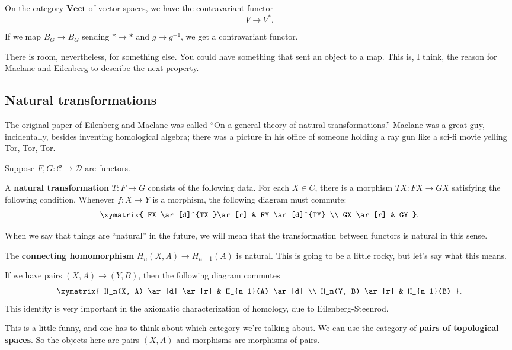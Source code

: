 \begin{example} On the category $\mathbf{Vect}$ of vector spaces, we have the
contravariant functor \[ V \to V^{\ast}. \] \end{example}

\begin{example} If we map $B_G \to B_G$ sending $\ast \to \ast$ and $g \to
g^{-1}$, we get a contravariant functor. \end{example}

There is room, nevertheless, for something else. You could have something that
sent an object to a map. This is, I think, the reason for Maclane and
Eilenberg to describe the next property.

\subsection{Natural transformations}

The original paper of Eilenberg and Maclane was called ``On a general theory
of natural transformations.'' Maclane was a great guy, incidentally, besides
inventing homological algebra; there was a picture in his office of someone
holding a ray gun like a sci-fi movie yelling Tor, Tor, Tor.

Suppose $F, G: \mathcal{C} \to \mathcal{D}$ are functors.

\begin{definition} A \textbf{natural transformation} $T: F \to G$ consists of
the following data. For each $X \in C$, there is a morphism $TX: FX \to GX$
satisfying the following condition. Whenever $f: X \to Y$ is a morphism, the
following diagram must commute: \[ \xymatrix{ FX \ar[d]^{TX }\ar[r] & FY
\ar[d]^{TY} \\ GX \ar[r] & GY }.\] \end{definition}

When we say that things are ``natural'' in the future, we will mean that the
transformation between functors is natural in this sense.

\begin{example} The \textbf{connecting homomorphism} $H_n(X, A) \to
H_{n-1}(A)$ is natural. This is going to be a little rocky, but let's say what
this means.

If we have pairs $(X, A) \to (Y, B)$, then the following diagram commutes \[
\xymatrix{ H_n(X, A) \ar[d] \ar[r] & H_{n-1}(A) \ar[d] \\ H_n(Y, B) \ar[r] &
H_{n-1}(B) }.\] This identity is very important in the axiomatic
characterization of homology, due to Eilenberg-Steenrod.

This is a little funny, and one has to think about which category we're
talking about. We can use the category of \textbf{pairs of topological
spaces}. So the objects here are pairs $(X, A)$ and morphisms are morphisms of
pairs. \end{example}

